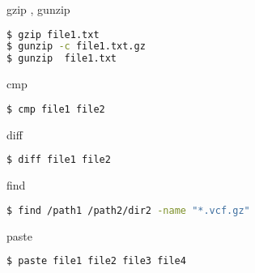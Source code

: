 \documentclass{beamer}
\begin{document}
\begin{frame}[fragile]
 \begin{center}
    \huge{gzip , gunzip}\\
    \end{center}
\begin{lstlisting}[language=bash]
$ gzip file1.txt
$ gunzip -c file1.txt.gz
$ gunzip  file1.txt
\end{lstlisting}
\end{frame}


\begin{frame}[fragile]
 \begin{center}
    \huge{cmp}\\
    \end{center}
\begin{lstlisting}[language=bash]
$ cmp file1 file2
\end{lstlisting}
\end{frame}

\begin{frame}[fragile]
 \begin{center}
    \huge{diff}\\
    \end{center}
\begin{lstlisting}[language=bash]
$ diff file1 file2
\end{lstlisting}
\end{frame}

\begin{frame}[fragile]
 \begin{center}
    \huge{find}\\
    \end{center}
\begin{lstlisting}[language=bash]
$ find /path1 /path2/dir2 -name "*.vcf.gz"
\end{lstlisting}
\end{frame}

\begin{frame}[fragile]
 \begin{center}
    \huge{paste}\\
    \end{center}
\begin{lstlisting}[language=bash]
$ paste file1 file2 file3 file4
\end{lstlisting}
\end{frame}
\end{document}
